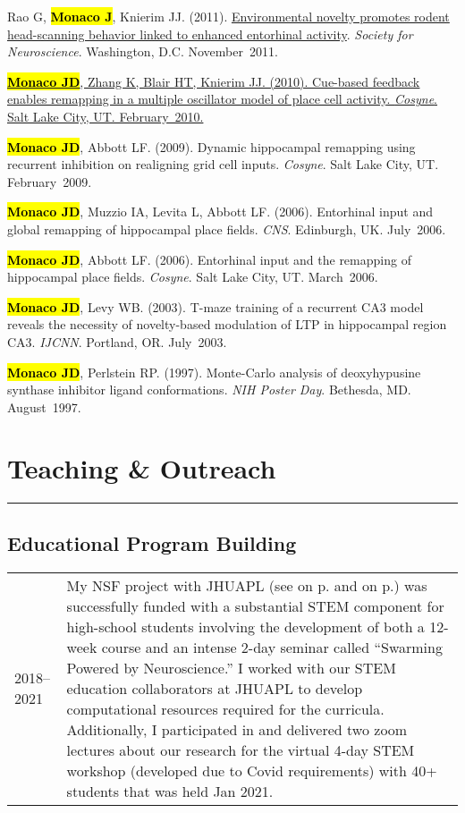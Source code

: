 \documentclass[10pt]{article}
\newcommand{\itemtitle}[1]{{\color{hopkinsblue}\ul{#1}}}
\newcommand{\unpubtitle}[1]{{\color{hopkinsblue} #1}}
\newcommand{\joehl}[1]{\hl{\textbf{#1}}}
\newcommand{\nameonpdottwo}[2]{\textcolor{hopkinsblue}{\emph{\nameref{sec:#1}} on
  p.\pageref{sec:#1}} and \textcolor{hopkinsblue}{\emph{\nameref{sec:#2}} on p.\pageref{sec:#2}}}
\newcommand{\newsection}[2]{%
  \section*{#1}
  \vspace{-.125in}
  \hrule
  \vspace{.22in}
  \label{sec:#2}
}
\begin{document}
\begin{description}
    {Rao G, \joehl{Monaco J}, Knierim JJ. (2011). \itemtitle{Environmental
        novelty promotes rodent head-scanning behavior linked to enhanced entorhinal
      activity}. \emph{Society for Neuroscience}. Washington,
    D.C. November~2011.}
  \item[\quad]
    \href{https://www.frontiersin.org/10.3389/conf.fnins.2010.03.00192/event_abstract}
    {\joehl{Monaco JD}, Zhang K, Blair HT, Knierim JJ. (2010).
      \itemtitle{Cue-based feedback enables remapping in a multiple oscillator
      model of place cell activity}. \emph{Cosyne}. Salt Lake City, UT.
    February~2010.}
  \item[\quad] \joehl{Monaco JD}, Abbott LF. (2009). \unpubtitle{Dynamic
      hippocampal remapping using recurrent inhibition on realigning grid cell
    inputs}. \emph{Cosyne}. Salt Lake City, UT. February~2009.
  \item[\quad] \joehl{Monaco JD}, Muzzio IA, Levita L, Abbott LF. (2006).
    \unpubtitle{Entorhinal input and global remapping of hippocampal place
    fields}. \emph{CNS}. Edinburgh, UK. July~2006.
  \item[\quad] \joehl{Monaco JD}, Abbott LF. (2006). \unpubtitle{Entorhinal
    input and the remapping of hippocampal place fields}. \emph{Cosyne}. Salt Lake
    City, UT. March~2006.
  \item[\quad] \joehl{Monaco JD}, Levy WB. (2003). \unpubtitle{T-maze training
      of a recurrent CA3 model reveals the necessity of novelty-based modulation of
    LTP in hippocampal region CA3}. \emph{IJCNN}. Portland, OR. July~2003.
  \item[\quad] \joehl{Monaco JD}, Perlstein RP. (1997). \unpubtitle{Monte-Carlo
    analysis of deoxyhypusine synthase inhibitor ligand conformations}. \emph{NIH
    Poster Day}. Bethesda, MD. August~1997.
\end{description}


\pagebreak
\newsection{Teaching \& Outreach}{teaching}

\subsection*{Educational Program Building}

\begin{tabular}{@{\hspace{0.2in}}l>{\raggedright\arraybackslash}p{}}
  2018--2021 \hspace{0.1in} & My NSF project with JHUAPL (see
  \nameonpdottwo{nsfaward}{nsfgrant}) was successfully funded with a substantial
  STEM component for high-school students involving the development of both
  a 12-week course and an intense 2-day seminar called ``Swarming Powered by
  Neuroscience.'' I worked with our STEM education collaborators at JHUAPL to
  develop computational resources required for the curricula. Additionally, I
  participated in and delivered two zoom lectures about our research for the
  virtual 4-day STEM workshop (developed due to Covid requirements) with 40+
  students that was held Jan 2021.
\end{tabular}
\end{document}
